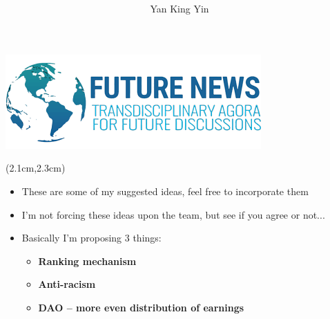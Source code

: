 \begin{preview}

\title{\vspace{-1cm} \bfseries\color{blue}{\LARGE Future News - some ideas}}

\author{Yan King Yin} %

\centerline{\includegraphics[scale=0.6]{Future-News-header.png}}

\maketitle

\setcounter{section}{-1}
\setcounter{mypage}{0}

\begin{textblock*}{5cm}(2.1cm,2.3cm) %
{\color{red}{\large \textcircled{\small \themypage}}}
\addtocounter{mypage}{1}
\end{textblock*}

\begin{minipage}{\textwidth}
\setlength{\parskip}{0.4\baselineskip}

\begin{itemize}
	\item These are some of my suggested ideas, feel free to incorporate them

	\item I'm not forcing these ideas upon the team, but see if you agree or not...

	\item Basically I'm proposing 3 things:
	\begin{itemize}
			\item \textbf{Ranking mechanism}
			\item \textbf{Anti-racism}
			\item \textbf{DAO -- more even distribution of earnings}

	\end{itemize}
\end{itemize}

\end{minipage}
\end{preview}

